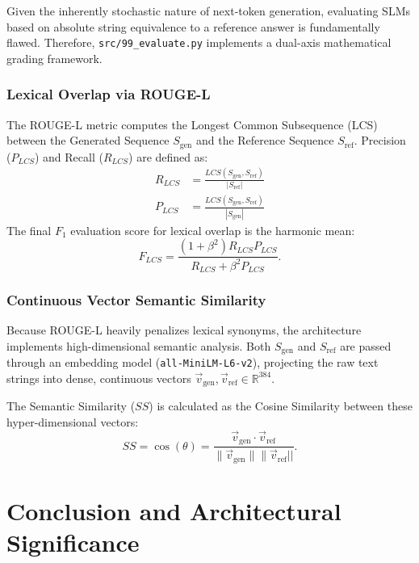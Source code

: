 \documentclass[12pt,a4paper]{report}
\newcommand{\R}{\mathbb{R}}
\begin{document}
Given the inherently stochastic nature of next-token generation, evaluating SLMs based on absolute string equivalence to a reference answer is fundamentally flawed. Therefore, \texttt{src/99_evaluate.py} implements a dual-axis mathematical grading framework.

\subsection{Lexical Overlap via ROUGE-L}
The ROUGE-L metric computes the Longest Common Subsequence (LCS) between the Generated Sequence $S_{\text{gen}}$ and the Reference Sequence $S_{\text{ref}}$. Precision ($P_{LCS}$) and Recall ($R_{LCS}$) are defined as:
\begin{align}
    R_{LCS} &= \frac{LCS(S_{\text{gen}}, S_{\text{ref}})}{|S_{\text{ref}}|} \\
    P_{LCS} &= \frac{LCS(S_{\text{gen}}, S_{\text{ref}})}{|S_{\text{gen}}|} 
\end{align}
The final $F_1$ evaluation score for lexical overlap is the harmonic mean:
\begin{equation}
    F_{LCS} = \frac{(1 + \beta^2) R_{LCS} P_{LCS}}{R_{LCS} + \beta^2 P_{LCS}}.
\end{equation}

\subsection{Continuous Vector Semantic Similarity}
Because ROUGE-L heavily penalizes lexical synonyms, the architecture implements high-dimensional semantic analysis. Both $S_{\text{gen}}$ and $S_{\text{ref}}$ are passed through an embedding model (\texttt{all-MiniLM-L6-v2}), projecting the raw text strings into dense, continuous vectors $\vec{v}_{\text{gen}}, \vec{v}_{\text{ref}} \in \R^{384}$. 

The Semantic Similarity ($SS$) is calculated as the Cosine Similarity between these hyper-dimensional vectors:
\begin{equation}
    SS = \cos(\theta) = \frac{\vec{v}_{\text{gen}} \cdot \vec{v}_{\text{ref}}}{\|\vec{v}_{\text{gen}}\| \|\vec{v}_{\text{ref}}||}. 
\end{equation}

\chapter{Conclusion and Architectural Significance}
\label{chap:conclusion}
\end{document}
